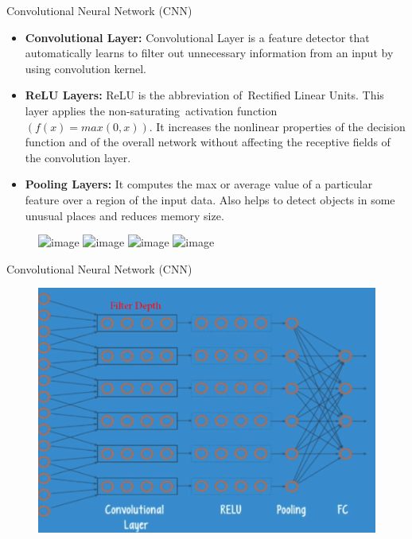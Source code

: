 \documentclass[10pt]{beamer}
\begin{document}
	\begin{frame}[t]{Convolutional Neural Network (CNN)}
		\begin{itemize}
			\item \textbf{Convolutional Layer:} Convolutional Layer is a feature detector that automatically
			learns to filter out unnecessary information from an input by using convolution
			kernel.
			\item \textbf{ReLU Layers:} ReLU is the abbreviation of Rectified Linear Units. This layer applies the	non-saturating activation function  $(f(x) = max(0, x))$. It increases the nonlinear properties of the decision function and of the overall network without affecting the receptive fields of the convolution layer.
			\item \textbf{Pooling Layers:} It computes the max or average value of a particular feature over a region of the input data. Also helps to detect objects in some unusual places and reduces memory size.
		\end{itemize}
		\begin{figure}[ht]
				\includegraphics<1>[width=0.75\linewidth]{images/cnn1.jpg}
				\includegraphics<2>[width=0.75\linewidth]{images/cnn2.jpg}
				\includegraphics<3>[width=0.75\linewidth]{images/cnn3.jpg}
				\includegraphics<4>[width=0.75\linewidth]{images/cnn4.jpg}
		\end{figure}
	\end{frame}
	\begin{frame}[c]{Convolutional Neural Network (CNN)}
		\begin{figure}
			\includegraphics[width=0.9\linewidth]{images/cnn5}
		\end{figure}
	\end{frame}
\end{document}
